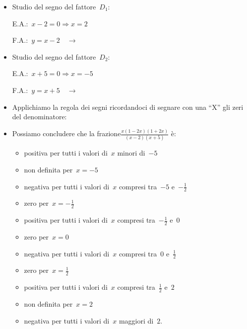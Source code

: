 \begin{esempio}
\begin{itemize} [noitemsep]
 \begin{minipage}{.3\textwidth}
  
 \end{minipage}
 \item Studio del segno del fattore~$D_1$:\\
 \begin{minipage}{.45\textwidth}
  E.A.:~$x-2=0 \Rightarrow x=2$
 \end{minipage}
 \begin{minipage}{.25\textwidth}
  F.A.:~$y=x-2 \quad \rightarrow$
 \end{minipage}
 \begin{minipage}{.3\textwidth}
  
 \end{minipage}
 \item Studio del segno del fattore~$D_2$:\\
 \begin{minipage}{.45\textwidth}
  E.A.:~$x+5=0 \Rightarrow x=-5$
 \end{minipage}
 \begin{minipage}{.25\textwidth}
  F.A.:~$y=x+5 \quad \rightarrow$
 \end{minipage}
 \begin{minipage}{.3\textwidth}
  
 \end{minipage}
 \item Applichiamo la regola dei segni ricordandoci di segnare con una ``X''
  gli zeri del denominatore:
  
 \item Possiamo concludere che la frazione$\frac{x(1 -2 x)(1 + 2 x)}{(x -2)(x 
+5)}$ è:
\begin{itemize} [noitemsep]
 \item positiva per tutti i valori di~$x$ minori di~$-5$
 \item non definita per~$x=-5$
 \item negativa per tutti i valori di~$x$ compresi tra~$-5$ e~$-\frac{1}{2}$
 \item zero per~$x=-\frac{1}{2}$
 \item positiva per tutti i valori di~$x$ compresi tra~$-\frac{1}{2}$ e~$0$
 \item zero per~$x=0$
 \item negativa per tutti i valori di~$x$ compresi tra~$0$ e~$\frac{1}{2}$
 \item zero per~$x=\frac{1}{2}$
 \item positiva per tutti i valori di~$x$ compresi tra~$\frac{1}{2}$ e~$2$
 \item non definita per~$x=2$
 \item negativa per tutti i valori di~$x$ maggiori di~$2$.
\end{itemize}
\end{itemize}
 \end{esempio}





